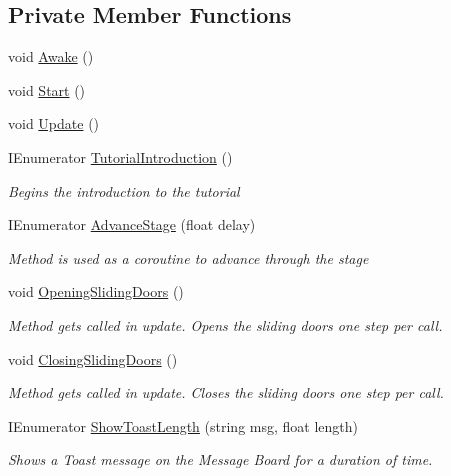 \subsection*{Private Member Functions}
\begin{DoxyCompactItemize}
\item 
void \mbox{\hyperlink{class_intro_session_manager_a7c36bee635e59c09531ed8c64665b0fd}{Awake}} ()
\item 
void \mbox{\hyperlink{class_intro_session_manager_af44cc6aa8fff0329411659f44ba29475}{Start}} ()
\item 
void \mbox{\hyperlink{class_intro_session_manager_ad430deae2d91891de87162529e915ab9}{Update}} ()
\item 
I\+Enumerator \mbox{\hyperlink{class_intro_session_manager_abbbe032dd983857f6a0d843686738bfc}{Tutorial\+Introduction}} ()
\begin{DoxyCompactList}\small\item\em Begins the introduction to the tutorial \end{DoxyCompactList}\item 
I\+Enumerator \mbox{\hyperlink{class_intro_session_manager_a93c526ae0e6c546c2ee76a6d150b4781}{Advance\+Stage}} (float delay)
\begin{DoxyCompactList}\small\item\em Method is used as a coroutine to advance through the stage \end{DoxyCompactList}\item 
void \mbox{\hyperlink{class_intro_session_manager_a6731f9f957d00bf47bb55f745f3af95b}{Opening\+Sliding\+Doors}} ()
\begin{DoxyCompactList}\small\item\em Method gets called in update. Opens the sliding doors one step per call. \end{DoxyCompactList}\item 
void \mbox{\hyperlink{class_intro_session_manager_a7cc8cfc2810a691bbc149f9688f68118}{Closing\+Sliding\+Doors}} ()
\begin{DoxyCompactList}\small\item\em Method gets called in update. Closes the sliding doors one step per call. \end{DoxyCompactList}\item 
I\+Enumerator \mbox{\hyperlink{class_intro_session_manager_ad809a83bf76ede581699a9efd0280a4c}{Show\+Toast\+Length}} (string msg, float length)
\begin{DoxyCompactList}\small\item\em Shows a Toast message on the Message Board for a duration of time. \end{DoxyCompactList}\item 

\end{DoxyCompactItemize}
